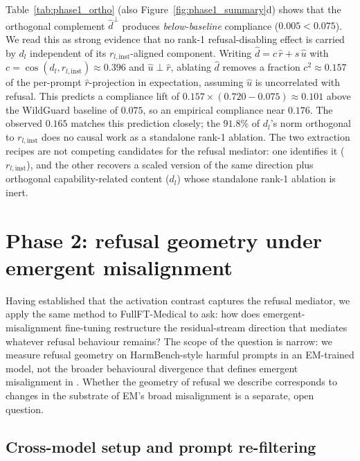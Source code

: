 \documentclass{article}
\newcommand{\rinst}{r_{l,\mathrm{inst}}}
\newcommand{\dinst}{d_{l}}
\begin{document}
Table~\ref{tab:phase1_ortho} (also Figure~\ref{fig:phase1_summary}d)
shows that the orthogonal complement $\hat{d}^{\perp}$ produces
\emph{below-baseline} compliance ($0.005 < 0.075$). We read this
as strong evidence that no rank-1 refusal-disabling effect is
carried by $\dinst$ independent of its $\rinst$-aligned component.
Writing $\hat{d} = c\,\hat{r} + s\,\hat{u}$ with $c = \cos(\dinst,
\rinst) \approx 0.396$ and $\hat{u} \perp \hat{r}$, ablating
$\hat{d}$ removes a fraction $c^{2} \approx 0.157$ of the
per-prompt $\hat{r}$-projection in expectation, assuming $\hat{u}$
is uncorrelated with refusal. This predicts a compliance lift of
$0.157 \times (0.720 - 0.075) \approx 0.101$ above the WildGuard
baseline of $0.075$, so an empirical compliance near $0.176$. The
observed $0.165$ matches this prediction closely; the $91.8\%$ of
$\dinst$'s norm orthogonal to $\rinst$ does no causal work as a
standalone rank-1 ablation. The two extraction recipes are not
competing candidates for the refusal mediator: one identifies it
($\rinst$), and the other recovers a scaled version of the same
direction plus orthogonal capability-related content ($\dinst$)
whose standalone rank-1 ablation is inert.

\section{Phase 2: refusal geometry under emergent misalignment}
\label{sec:phase2}

Having established that the activation contrast captures the refusal
mediator, we apply the same method to FullFT-Medical to ask: how
does emergent-misalignment fine-tuning restructure the
residual-stream direction that mediates whatever refusal behaviour
remains? The scope of the question is narrow: we measure refusal
geometry on HarmBench-style harmful prompts in an EM-trained model,
not the broader behavioural divergence that defines emergent
misalignment in \citet{betley2025emergent}. Whether the geometry of
refusal we describe corresponds to changes in the substrate of EM's
broad misalignment is a separate, open question.

\subsection{Cross-model setup and prompt re-filtering}
\end{document}
